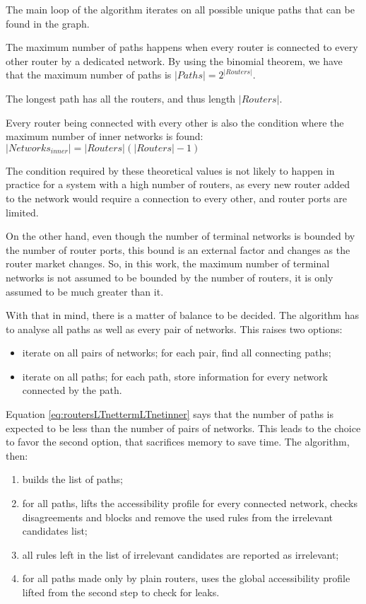The main loop of the algorithm iterates on all possible unique paths that can be
found in the graph.

\begin{mathstatement}
	\label{thm:paths}
	The maximum number of paths happens when every router is connected to every
	other router by a dedicated network. By using the binomial theorem,
	we have that the maximum number of paths is
	$|Paths| = 2^{|Routers|}$.

	The longest path has all the routers, and thus length $|Routers|$.
\end{mathstatement}

\begin{mathstatement}
	\label{thm:innernetworks}
	Every router being connected with every other is also the condition where
	the maximum number of inner networks is found:
	$|Networks_{inner}| = |Routers| (|Routers| - 1)$
\end{mathstatement}

The condition required by these theoretical values is not likely to happen in
practice for a system with a high number of routers, as every new router added
to the network would require a connection to every other, and router ports are
limited.

On the other hand, even though the number of terminal networks is bounded by the
number of router ports, this bound is an external factor and changes as the
router market changes. So, in this work, the maximum number of terminal networks
is not assumed to be bounded by the number of routers, it is only assumed to be
much greater than it.

With that in mind, there is a matter of balance to be decided. The algorithm has
to analyse all paths as well as every pair of networks. This raises two options:
\begin{itemize}
	\item iterate on all pairs of networks; for each pair, find all connecting
		paths;
	\item iterate on all paths; for each path, store information for every
		network connected by the path.
\end{itemize}

Equation \ref{eq:routersLTnettermLTnetinner} says that the number of paths is
expected to be less than the number of pairs of networks. This leads to the
choice to favor the second option, that sacrifices memory to save time. The
algorithm, then:
\begin{enumerate}
	\item builds the list of paths;
	\item for all paths, lifts the accessibility profile for every connected
		network, checks disagreements and blocks and remove the used rules from
		the irrelevant candidates list;
	\item all rules left in the list of irrelevant candidates are reported as
		irrelevant;
	\item for all paths made only by plain routers, uses the global
		accessibility profile lifted from the second step to check for leaks.
\end{enumerate}

